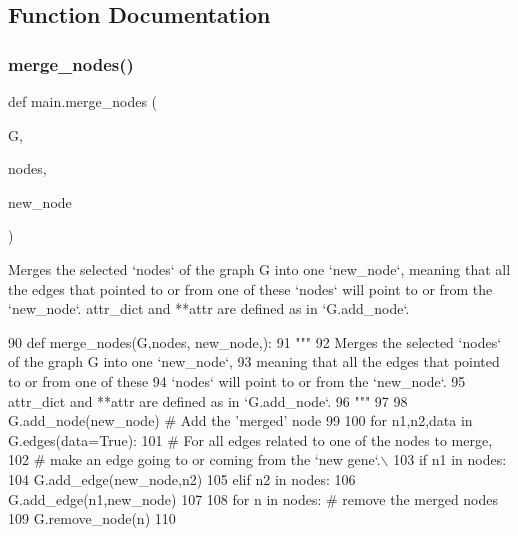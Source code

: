 \subsection{Function Documentation}
\mbox{\label{namespacemain_a42969f03e14f9d500397028177ed72ec}} 
\subsubsection{\texorpdfstring{merge\+\_\+nodes()}{merge\_nodes()}}
{\footnotesize\ttfamily def main.\+merge\+\_\+nodes (\begin{DoxyParamCaption}\item[{}]{G,  }\item[{}]{nodes,  }\item[{}]{new\+\_\+node }\end{DoxyParamCaption})}

\begin{DoxyVerb}Merges the selected `nodes` of the graph G into one `new_node`,
meaning that all the edges that pointed to or from one of these
`nodes` will point to or from the `new_node`.
attr_dict and **attr are defined as in `G.add_node`.
\end{DoxyVerb}
 
\begin{DoxyCode}
90 \textcolor{keyword}{def }merge\_nodes(G,nodes, new\_node,):
91     \textcolor{stringliteral}{"""}
92 \textcolor{stringliteral}{    Merges the selected `nodes` of the graph G into one `new\_node`,}
93 \textcolor{stringliteral}{    meaning that all the edges that pointed to or from one of these}
94 \textcolor{stringliteral}{    `nodes` will point to or from the `new\_node`.}
95 \textcolor{stringliteral}{    attr\_dict and **attr are defined as in `G.add\_node`.}
96 \textcolor{stringliteral}{    """}
97 
98     G.add\_node(new\_node) \textcolor{comment}{# Add the 'merged' node}
99 
100     \textcolor{keywordflow}{for} n1,n2,data \textcolor{keywordflow}{in} G.edges(data=\textcolor{keyword}{True}):
101         \textcolor{comment}{# For all edges related to one of the nodes to merge,}
102         \textcolor{comment}{# make an edge going to or coming from the `new gene`.\(\backslash\)}
103         \textcolor{keywordflow}{if} n1 \textcolor{keywordflow}{in} nodes:
104             G.add\_edge(new\_node,n2)
105         \textcolor{keywordflow}{elif} n2 \textcolor{keywordflow}{in} nodes:
106             G.add\_edge(n1,new\_node)
107 
108     \textcolor{keywordflow}{for} n \textcolor{keywordflow}{in} nodes: \textcolor{comment}{# remove the merged nodes}
109         G.remove\_node(n)
110 
\end{DoxyCode}

